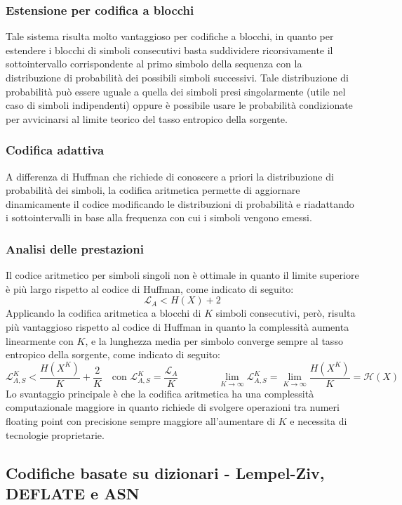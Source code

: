 \subsubsection*{Estensione per codifica a blocchi}
Tale sistema risulta molto vantaggioso per codifiche a blocchi, in quanto per estendere i blocchi di simboli consecutivi
basta suddividere ricorsivamente il sottointervallo corrispondente al primo simbolo della sequenza con la distribuzione di
probabilità dei possibili simboli successivi. Tale distribuzione di probabilità può essere uguale a quella dei simboli presi
singolarmente (utile nel caso di simboli indipendenti) oppure è possibile usare le probabilità condizionate per avvicinarsi
al limite teorico del tasso entropico della sorgente.

\subsubsection*{Codifica adattiva}
A differenza di Huffman che richiede di conoscere a priori la distribuzione di probabilità dei simboli, la codifica aritmetica
permette di aggiornare dinamicamente il codice modificando le distribuzioni di probabilità e riadattando i sottointervalli
in base alla frequenza con cui i simboli vengono emessi.

\subsubsection*{Analisi delle prestazioni}
Il codice aritmetico per simboli singoli non è ottimale in quanto il limite superiore è più largo rispetto al codice di
Huffman, come indicato di seguito:
\[\mathcal{L}_A < H(X) + 2\]
Applicando la codifica aritmetica a blocchi di \(K\) simboli consecutivi, però, risulta più vantaggioso rispetto al codice
di Huffman in quanto la complessità aumenta linearmente con \(K\), e la lunghezza media per simbolo converge sempre al
tasso entropico della sorgente, come indicato di seguito:
\[\mathcal{L}_{A,S}^K < \frac{H(X^K)}{K} + \frac{2}{K} \quad \text{con } \mathcal{L}_{A,S}^K = \frac{\mathcal{L}_A}{K} \qquad\qquad \lim_{K \to \infty} \mathcal{L}_{A,S}^K = \lim_{K \to \infty} \frac{H(X^K)}{K} = \mathcal{H}(X)\]
Lo svantaggio principale è che la codifica aritmetica ha una complessità computazionale maggiore in quanto richiede di
svolgere operazioni tra numeri floating point con precisione sempre maggiore all'aumentare di \(K\) e necessita di tecnologie
proprietarie.

\subsection{Codifiche basate su dizionari - Lempel-Ziv, DEFLATE e ASN}
